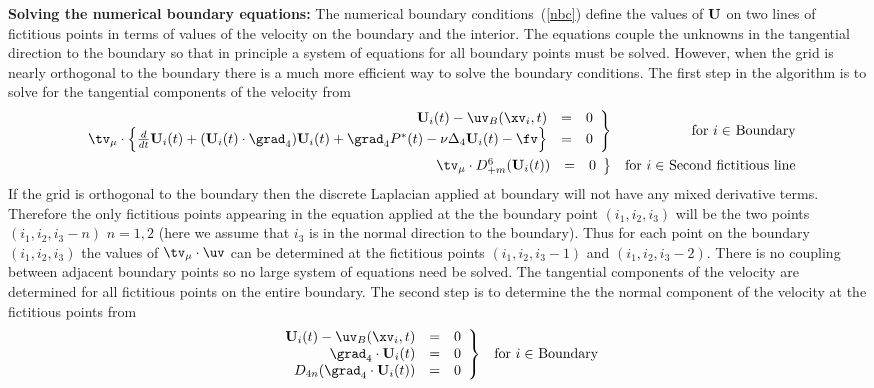\documentclass[10pt]{article}
\begin{document}
{\bf Solving the numerical boundary equations:}
The numerical boundary conditions~(\ref{nbc}) define the
values of $\mathbf{U}$ on two lines of fictitious points in terms
of values of the velocity on the boundary and the interior.
The equations couple the unknowns in the tangential direction
to the boundary so that in principle a system of equations for
all boundary points must be solved. However, when the grid
is nearly orthogonal to the boundary there is a much more
efficient way to solve the boundary conditions.
The first step in the algorithm is to solve for the tangential
components of the velocity from
\begin{eqnarray*}
  \left. \begin{array}{rcl}
 \uvd_{\id}(t)  -\uv_B(\xv_\id,t) &=& 0 \\
\tv_\mu\cdot\Big\{
 {d\over dt} \uvd_{\id}(t)
+ (\uvd_{\id}(t)\cdot\grad_4)\uvd_{\id}(t)
  +\grad_4 \pd^*(t) -\nu\Delta_4 \uvd_{\id}(t)-\fv\Big\} &=& 0
  \end{array} \right \}
     &&  \mbox{for $\id\in$ Boundary}        \\
  \left. \begin{array}{rcl}
  \tv_\mu\cdot D_{+m}^6( \uvd_{\id}(t) )  &=& 0
  \end{array}  \right \}
     && \mbox{for $\id\in$ Second fictitious line}     \nonumber
\end{eqnarray*}
If the grid is orthogonal to the boundary then the
discrete Laplacian applied at boundary
will not have any mixed derivative terms. Therefore the only
fictitious points appearing in the equation applied at the
the boundary point $(i_1,i_2,i_3)$
will be the two points $(i_1,i_2,i_3-n)$
$n=1,2$ (here we assume that $i_3$ is in the normal direction
to the boundary).
Thus for each point on the boundary $(i_1,i_2,i_3)$
the values of $\tv_\mu\cdot\uv$ can be determined at
the fictitious points $(i_1,i_2,i_3-1)$ and $(i_1,i_2,i_3-2)$.
There is no coupling between adjacent boundary points so no
large system of equations need be solved.
The tangential components of the velocity are
determined for all fictitious points on the entire boundary.
The second step is to determine the
the normal component of
the velocity at the fictitious points from
\begin{eqnarray*}
  \left. \begin{array}{rcl}
 \uvd_{\id}(t)  -\uv_B(\xv_\id,t) &=& 0 \\
 \grad_4 \cdot \uvd_{\id}(t)  &=& 0     \\
 D_{4n} ( \grad_4\cdot \uvd_{\id}(t) ) &=& 0
  \end{array} \right \}
     &&  \mbox{for $\id\in$ Boundary}
\end{eqnarray*}
\end{document}
